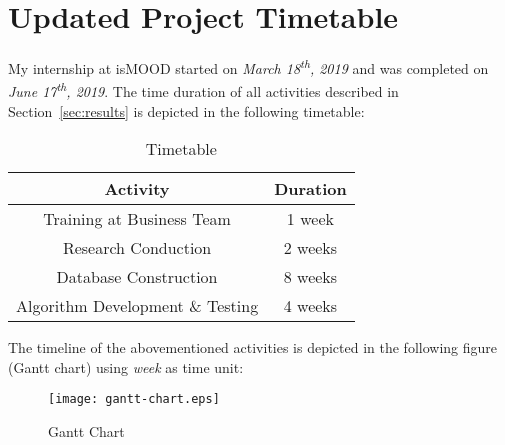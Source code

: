 \section{Updated Project Timetable}
\label{sec:timetable}

My internship at isMOOD started
on \emph{March 18\textsuperscript{th}, 2019}
and was completed 
on \emph{June 17\textsuperscript{th}, 2019}.
The time duration of all activities
described in Section~\ref{sec:results}
is depicted in the following timetable:

\begin{table}[ht]
\caption{\label{tab:timetable}Timetable}
\centering
\begin{tabular}{ |c|c| }
 \hline
 \textbf{Activity} & \textbf{Duration} \\ 
 \hline
 Training at Business Team & 1 week \\
 \hline
 Research Conduction & 2 weeks \\ 
 \hline
 Database Construction & 8 weeks \\ 
 \hline
 Algorithm Development \& Testing & 4 weeks \\
 \hline
\end{tabular}
\end{table}

The timeline of the abovementioned activities
is depicted in the following figure (Gantt chart)
using \emph{week} as time unit:

\begin{figure}[ht]
\centering
\texttt{[image: gantt-chart.eps]}
\caption{Gantt Chart}
\label{fig:gantt-chart}
\end{figure}

% 
